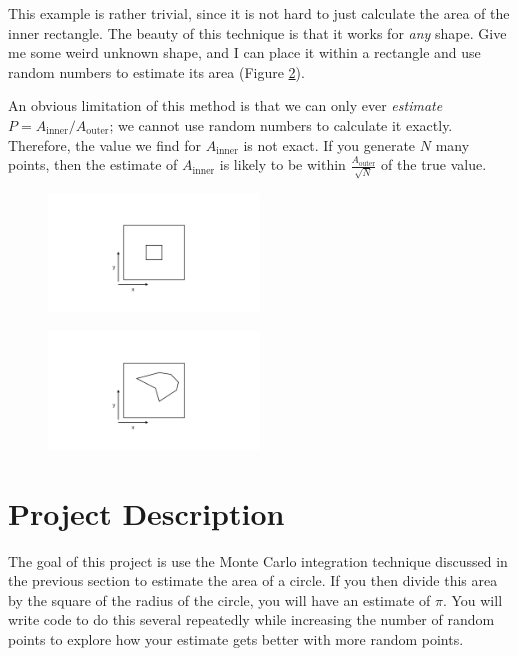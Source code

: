 \documentclass{article}
\begin{document}
This example is rather trivial, since it is not hard to just calculate the area of the inner rectangle. The beauty of this technique is that it works for \textit{any} shape. Give me some weird unknown shape, and I can place it within a rectangle and use random numbers to estimate its area (Figure \ref{rect2}).

An obvious limitation of this method is that we can only ever \textit{estimate} $P=A_\mathrm{inner}/A_\mathrm{outer}$; we cannot use random numbers to calculate it exactly. Therefore, the value we find for $A_\mathrm{inner}$ is not exact. If you generate $N$ many points, then the estimate of $A_\mathrm{inner}$ is likely to be within $\frac{A_\mathrm{outer}}{\sqrt{N}}$ of the true value.
\begin{figure}[ht!]
	\centering
	\includegraphics[width=0.5\textwidth]{mc_integral_fig}
	\caption{}
	\label{rect}
\end{figure}

\begin{figure}[ht!]
	\centering
	\includegraphics[width=0.5\textwidth]{mc_integral_fig_2}
	\caption{}
	\label{rect2}
\end{figure}

\section*{Project Description}
The goal of this project is use the Monte Carlo integration technique discussed in the previous section to estimate the area of a circle. If you then divide this area by the square of the radius of the circle, you will have an estimate of $\pi$. You will write code to do this several repeatedly while increasing the number of random points to explore how your estimate gets better with more random points.
\end{document}
